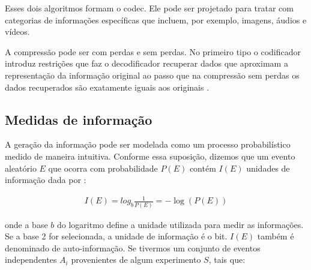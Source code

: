 Esses dois algoritmos formam o \acrshort{codec}. Ele pode ser projetado para tratar com categorias de informações específicas que incluem, por exemplo, imagens, áudios e vídeos. 


A compressão pode ser com perdas e sem perdas. No primeiro tipo o codificador introduz restrições que faz o decodificador recuperar dados que aproximam a representação da informação original ao passo que na compressão sem perdas os dados recuperados são exatamente iguais aos originais \cite{sayood2017introduction}. 

\subsection{Medidas de informação}


A geração da informação pode ser modelada como um processo probabilístico medido de maneira intuitiva. Conforme essa suposição, dizemos que um evento aleatório $E$ que ocorra com probabilidade $P(E)$ contém $I(E)$ unidades de informação dada por \cite{marques1999processamento}:

\begin{equation}
\begin{aligned}
I(E) = log_{b}\frac{1}{P(E)} = - \log (P(E)) 
\end{aligned}
\end{equation}

onde a base $b$ do logaritmo define a unidade utilizada para medir as informações. Se a base 2 for selecionada, a unidade de informação é o bit. $I(E)$ também é denominado de auto-informação. Se tivermos um conjunto de eventos independentes $A_i$ provenientes de algum experimento $S$, tais que:


